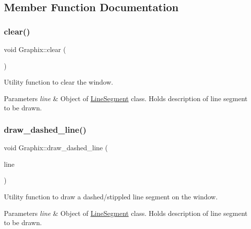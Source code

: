 \subsection{Member Function Documentation}
\mbox{\label{classGraphix_a1ac1a5725a869ef074da6fe3cab29b0e}} 
\subsubsection{\texorpdfstring{clear()}{clear()}}
{\footnotesize\ttfamily void Graphix\+::clear (\begin{DoxyParamCaption}{ }\end{DoxyParamCaption})}

Utility function to clear the window. 
\begin{DoxyParams}{Parameters}
{\em line} & Object of \hyperlink{classLineSegment}{Line\+Segment} class. Holds description of line segment to be drawn. \\
\hline
\end{DoxyParams}
\mbox{\label{classGraphix_af03ba028ad5bbb721a798c5b48450444}} 
\subsubsection{\texorpdfstring{draw\+\_\+dashed\+\_\+line()}{draw\_dashed\_line()}}
{\footnotesize\ttfamily void Graphix\+::draw\+\_\+dashed\+\_\+line (\begin{DoxyParamCaption}\item[{\hyperlink{classLineSegment}{Line\+Segment}}]{line }\end{DoxyParamCaption})}

Utility function to draw a dashed/stippled line segment on the window. 
\begin{DoxyParams}{Parameters}
{\em line} & Object of \hyperlink{classLineSegment}{Line\+Segment} class. Holds description of line segment to be drawn. \\
\hline
\end{DoxyParams}
\mbox{\label{classGraphix_af2bd73aa70b282536cbfd2c19f0352bf}} 
